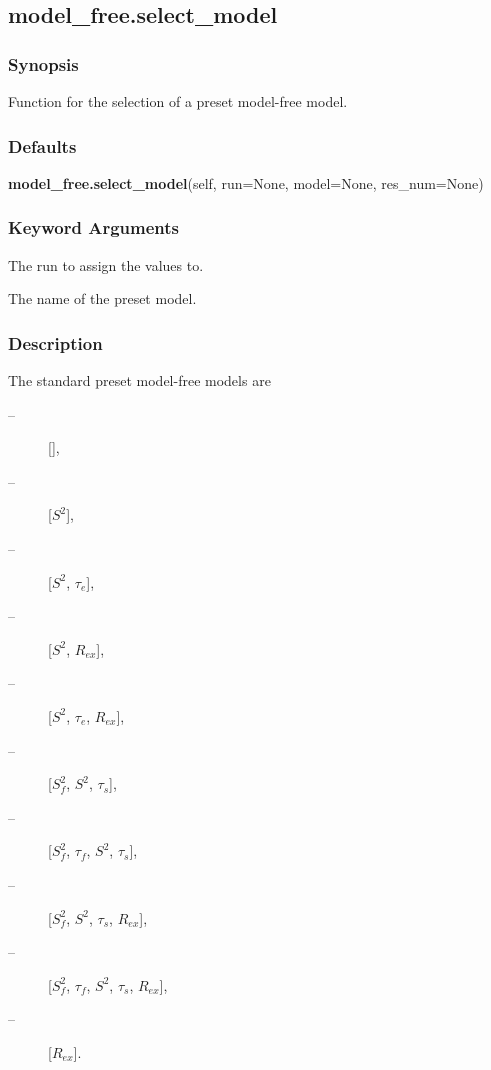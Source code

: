 


\newpage

\subsection{model\_free.select\_model}


\subsubsection{Synopsis}

Function for the selection of a preset model-free model.

\subsubsection{Defaults}

\textsf{\textbf{model\_free.select\_model}(self, run=None, model=None, res\_num=None)}


\subsubsection{Keyword Arguments}


  The run to assign the values to.

  The name of the preset model.

\subsubsection{Description}

The standard preset model-free models are
\begin{description}
\item[    
 --]   [],
\item[    
 --]   [$S^2$],
\item[    
 --]   [$S^2$, $\tau_e$],
\item[    
 --]   [$S^2$, $R_{ex}$],
\item[    
 --]   [$S^2$, $\tau_e$, $R_{ex}$],
\item[    
 --]   [$S^2_f$, $S^2$, $\tau_s$],
\item[    
 --]   [$S^2_f$, $\tau_f$, $S^2$, $\tau_s$],
\item[    
 --]   [$S^2_f$, $S^2$, $\tau_s$, $R_{ex}$],
\item[    
 --]   [$S^2_f$, $\tau_f$, $S^2$, $\tau_s$, $R_{ex}$],
\item[    
 --]   [$R_{ex}$].
\end{description}

